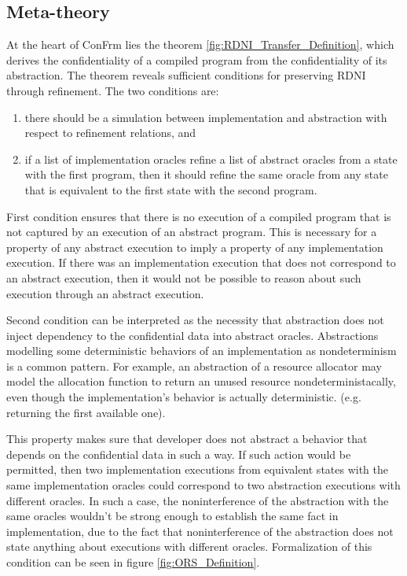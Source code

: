 \subsection{Meta-theory}
At the heart of ConFrm lies the theorem \ref{fig:RDNI_Transfer_Definition}, which derives the confidentiality of a compiled program from the confidentiality of its abstraction. The theorem reveals sufficient conditions for preserving RDNI through refinement. The two conditions are:

\begin{enumerate}
    \item there should be a simulation between implementation and abstraction with respect to refinement relations, and
    \item if a list of implementation oracles refine a list of abstract oracles from a state with the first program, then it should refine the same oracle from any state that is equivalent to the first state with the second program.
\end{enumerate}

First condition ensures that there is no execution of a compiled program that is not captured by an execution of an abstract program. This is necessary for a property of any abstract execution to imply a property of any implementation execution. If there was an implementation execution that does not correspond to an abstract execution, then it would not be possible to reason about such execution through an abstract execution.

Second condition can be interpreted as the necessity that abstraction does not inject dependency to the confidential data into abstract oracles. Abstractions modelling some deterministic behaviors of an implementation as nondeterminism is a common pattern. For example, an abstraction of a resource allocator may model the allocation function to return an unused resource nondeterministacally, even though the implementation's behavior is actually deterministic. (e.g. returning the first available one). 

This property makes sure that developer does not abstract a behavior that depends on the confidential data in such a way. If such action would be permitted, then two implementation executions from equivalent states with the same implementation oracles could correspond to two abstraction executions with different oracles. In such a case, the noninterference of the abstraction with the same oracles wouldn't be strong enough to establish the same fact in implementation, due to the fact that noninterference of the abstraction does not state anything about executions with different oracles. Formalization of this condition can be seen in figure \ref{fig:ORS_Definition}.

